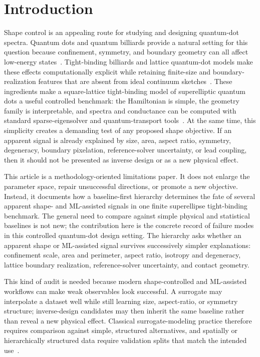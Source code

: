 \section{Introduction}

Shape control is an appealing route for studying and designing quantum-dot
spectra. Quantum dots and quantum billiards provide a natural setting for this
question because confinement, symmetry, and boundary geometry can all affect
low-energy states~\cite{reimann2002quantumdots,kouwenhoven2001fewelectron,berry1981sinai,stockmann1990quantumchaos}.
Tight-binding billiards and lattice quantum-dot models make these effects
computationally explicit while retaining finite-size and boundary-realization
features that are absent from ideal continuum sketches~\cite{cuevas1996chaoticbilliards,ulcakar2022tightbindingbilliards}.
These ingredients make a square-lattice tight-binding model of superelliptic
quantum dots a useful controlled benchmark: the Hamiltonian is simple, the
geometry family is interpretable, and spectra and conductance can be computed
with standard sparse-eigensolver and quantum-transport tools~\cite{groth2014kwant,datta2005quantumtransport}.
At the same time, this simplicity creates a demanding test of any proposed shape
objective. If an apparent signal is already explained by size, area, aspect
ratio, symmetry, degeneracy, boundary pixelation, reference-solver uncertainty,
or lead coupling, then it should not be presented as inverse design or as a new
physical effect.

This article is a methodology-oriented limitations paper. It does not enlarge
the parameter space, repair unsuccessful directions, or promote a new objective.
Instead, it documents how a baseline-first hierarchy determines the fate of
several apparent shape- and ML-assisted signals in one finite superellipse
tight-binding benchmark. The general need to compare against simple physical
and statistical baselines is not new; the contribution here is the concrete
record of failure modes in this controlled quantum-dot design setting. The
hierarchy asks whether an apparent shape or ML-assisted signal survives
successively simpler explanations: confinement scale, area and perimeter,
aspect ratio, isotropy and degeneracy, lattice boundary realization,
reference-solver uncertainty, and contact geometry.

This kind of audit is needed because modern shape-controlled and
ML-assisted workflows can make weak observables look successful. A surrogate
may interpolate a dataset well while still learning size, aspect-ratio, or
symmetry structure; inverse-design candidates may then inherit the same
baseline rather than reveal a new physical effect. Classical surrogate-modeling
practice therefore requires comparison against simple, structured alternatives,
and spatially or hierarchically structured data require validation splits that
match the intended use~\cite{bishop2006prml,hastie2009elements,forrester2008surrogate,queipo2005surrogate,roberts2017crossvalidation}.

